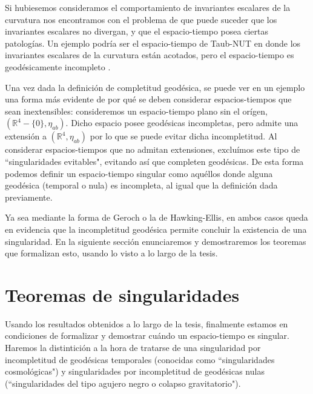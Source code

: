 Si hubiesemos consideramos el comportamiento de invariantes escalares de la curvatura nos encontramos con el problema de que puede suceder que los invariantes escalares no divergan, y que el espacio-tiempo posea ciertas patologías. Un ejemplo podría ser el espacio-tiempo de Taub-NUT en donde los invariantes escalares de la curvatura están acotados, pero el espacio-tiempo es geodésicamente incompleto \citep{2017JCAP...01..001O}.

Una vez dada la definición de completitud geodésica, se puede ver en un ejemplo una forma más evidente de por qué se deben considerar espacios-tiempos que sean inextensibles: consideremos un espacio-tiempo plano sin el orígen, $(\mathbb{R}^4-\{0\},\eta_{ab})$. Dicho espacio posee geodésicas incompletas, pero admite una extensión a $(\mathbb{R}^4,\eta_{ab})$ por lo que se puede evitar dicha incompletitud. Al considerar espacios-tiempos que no admitan extensiones, excluímos este tipo de ``singularidades evitables", evitando así que completen geodésicas. De esta forma podemos definir un espacio-tiempo singular como aquéllos donde alguna geodésica (temporal o nula) es incompleta, al igual que la definición dada previamente.

Ya sea mediante la forma de Geroch o la de Hawking-Ellis, en ambos casos queda en evidencia que la incompletitud geodésica permite concluir la existencia de una singularidad. En la siguiente sección enunciaremos y demostraremos los teoremas que formalizan esto, usando lo visto a lo largo de la tesis.












    
\section{Teoremas de singularidades} \label{seccion teo sing}

Usando los resultados obtenidos a lo largo de la tesis, finalmente estamos en condiciones de formalizar y demostrar cuándo un espacio-tiempo es singular. Haremos la distintición a la hora de tratarse de una singularidad por incompletitud de geodésicas temporales (conocidas como ``singularidades cosmológicas") y singularidades por incompletitud de geodésicas nulas (``singularidades del tipo agujero negro o colapso gravitatorio"). 

